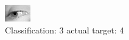 \begin{figure}[h!]
\begin{center}
\includegraphics[width=0.60\columnwidth]{figures/ID3062_class_3_target_4.png}
\end{center}
\caption{ Classification: 3 actual target: 4}
\label{fig:ID3062_class_3_target_4}
\end{figure}
